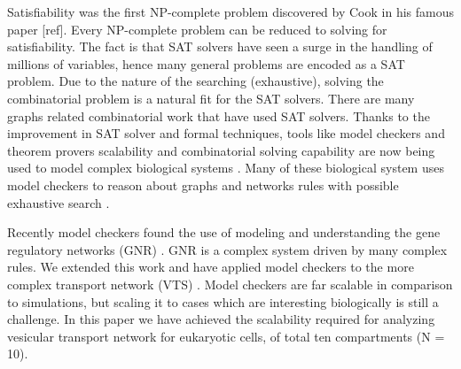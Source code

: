 
Satisfiability was the first NP-complete problem discovered by Cook in his famous paper [ref]. Every NP-complete problem can be reduced to solving for satisfiability. The fact is that SAT solvers have seen a surge in the handling of millions of variables, hence many general problems are encoded as a SAT problem. Due to the nature of the searching (exhaustive), solving the combinatorial problem is a natural fit for the SAT solvers. There are many graphs related combinatorial work \cite{gay2013solving,wotzlaw2012generalized} that have used SAT solvers. Thanks to the improvement in SAT solver and formal techniques, tools like model checkers and theorem provers scalability and combinatorial solving capability are now being used to model complex biological systems \cite{heule2010exact,yordanov2013smt,mangla2010timing}.
Many of these biological system uses model checkers to reason about graphs and networks rules with possible exhaustive search \cite{guerra2012reasoning,chin2008biographe}.  

Recently model checkers found the use of modeling and understanding the gene regulatory networks (GNR) \cite{giacobbe2015model,rosenblueth2014inference, batt2010efficient}. GNR is a complex system driven by many complex rules. We extended this work and have applied model checkers to the more complex transport network (VTS) \cite{mani2016stacking}. Model checkers are far scalable in comparison to simulations, but scaling it to cases which are interesting biologically is still a challenge. In this paper we have achieved the scalability required for analyzing vesicular transport network for eukaryotic cells, of total ten compartments (N = 10). \\


